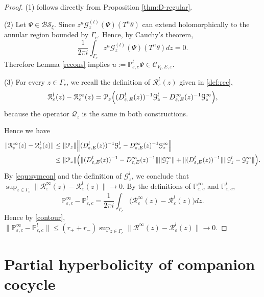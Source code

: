 \documentclass[reqno,11pt]{amsart}
\begin{document}
\begin{proof}
(1) follows directly from Proposition \ref{thm:D-regular}. 

(2)  Let $\Psi \in \mathcal{BS}_\xi$. Since $z^n\mathcal G_z^{(l)}(\Psi)(T^n\theta)$ can
extend holomorphically to the annular region bounded by $\Gamma_c$. Hence, by
Cauchy's theorem,
$$
\frac{1}{2\pi i}\int_{\Gamma_c}
z^n\mathcal G_z^{(l)}(\Psi)(T^n\theta)dz=0.
$$ Therefore Lemma \ref{recons} implies
$
u:= \mathbb{ P }_{\varepsilon,c}^{l}\Psi\in  \mathcal{C}_{V_l,E,\varepsilon}.
$


(3) For every $z\in\Gamma_c$, we recall the definition of  $\mathcal R^{l}_\varepsilon(z)$ given in \eqref{def:rec},
$$
\mathcal R^{l}_\varepsilon(z)-\mathcal R^{\infty}_{\varepsilon}(z)=
\mathcal{P}_z\Bigl(
(D_{\varepsilon,E}^{ l}(z))^{-1}\mathcal{G}_z^l-
D^{\infty}_{\varepsilon,E}(z)^{-1}\mathcal{G}_z^\infty
\Bigr),
$$
because the operator $\mathcal{Q}_z$ is the same in both constructions.

Hence we have
\begin{align*}
\|\mathcal R_{\varepsilon}^{\infty}(z)-\mathcal R^{l}_\varepsilon(z)\|
&\leq
\|\mathcal{P}_z\| \Bigl\|
(D_{\varepsilon,E}^{ l}(z))^{-1}\mathcal{G}_z^l-
D^{\infty}_{\varepsilon,E}(z)^{-1}\mathcal{G}_z^\infty\Bigr\|
\\
&\leq
\|\mathcal{P}_z\|\Bigl(
\|(D_{\varepsilon,E}^{ l}(z))^{-1}-D^{\infty}_{\varepsilon,E}(z)^{-1}\| \|\mathcal{G}_z^\infty\|
+\|(D_{\varepsilon,E}^{ l}(z))^{-1}\| \|\mathcal{G}_z^l-\mathcal{G}_z^\infty\|\Bigr).
\end{align*}
By \eqref{equ:symcon} and the definition of $\mathcal{G}_z^l$, 
we conclude that
$
\sup_{z\in\Gamma_c}\|\mathcal R^{\infty}_{\varepsilon}(z)-\mathcal R^{l}_\varepsilon(z)\|\to 0.
$
By the definitions of $\mathbb{ P }_{\varepsilon,c}^{\infty}$ and $\mathbb{ P }_{\varepsilon,c}^{l}$,
$$
\mathbb{ P }_{\varepsilon,c}^{\infty}-\mathbb{ P }_{\varepsilon,c}^{l}=
\frac{1}{2\pi i}\int_{\Gamma_c}
\bigl(\mathcal R^{\infty}_{\varepsilon}(z)-\mathcal R^{l}_\varepsilon(z)\bigr) dz.
$$
Hence by \eqref{contour},
$
\|\mathbb{ P }_{\varepsilon,c}^{\infty}-\mathbb{ P }_{\varepsilon,c}^{l}\|
\leq(r_++r_-)
\sup_{z\in\Gamma_c}
\|\mathcal R^{\infty}(z)-\mathcal R^{l}_\varepsilon(z)\|\to0.
$
\end{proof}










\section{Partial hyperbolicity of companion cocycle}\label{PHFC}
\end{document}
